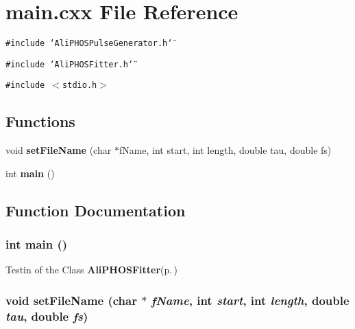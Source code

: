 \section{main.cxx File Reference}
\label{main_8cxx}
{\tt \#include \char`\"{}Ali\-PHOSPulse\-Generator.h\char`\"{}}\par
{\tt \#include \char`\"{}Ali\-PHOSFitter.h\char`\"{}}\par
{\tt \#include $<$stdio.h$>$}\par
\subsection*{Functions}
\begin{CompactItemize}
\item 
void {\bf set\-File\-Name} (char $\ast$f\-Name, int start, int length, double tau, double fs)
\item 
int {\bf main} ()
\end{CompactItemize}


\subsection{Function Documentation}
\subsubsection{\setlength{\rightskip}{0pt plus 5cm}int main ()}\label{main_8cxx_a1}


Testin of the Class {\bf Ali\-PHOSFitter}{\rm (p.\,\pageref{classAliPHOSFitter})} 
\subsubsection{\setlength{\rightskip}{0pt plus 5cm}void set\-File\-Name (char $\ast$ {\em f\-Name}, int {\em start}, int {\em length}, double {\em tau}, double {\em fs})}\label{main_8cxx_a0}


